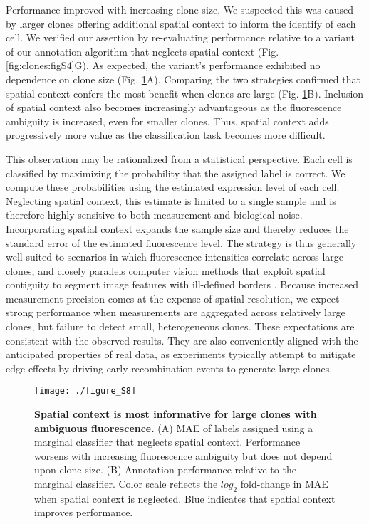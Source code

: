 Performance improved with increasing clone size. We suspected this was caused by larger clones offering additional spatial context to inform the identify of each cell. We verified our assertion by re-evaluating performance relative to a variant of our annotation algorithm that neglects spatial context (Fig. \ref{fig:clones:figS4}G). As expected, the variant's performance exhibited no dependence on clone size (Fig. \ref{fig:clones:figS8}A). Comparing the two strategies confirmed that spatial context confers the most benefit when clones are large (Fig. \ref{fig:clones:figS8}B). Inclusion of spatial context also becomes increasingly advantageous as the fluorescence ambiguity is increased, even for smaller clones. Thus, spatial context adds progressively more value as the classification task becomes more difficult.

This observation may be rationalized from a statistical perspective. Each cell is classified by maximizing the probability that the assigned label is correct. We compute these probabilities using the estimated expression level of each cell. Neglecting spatial context, this estimate is limited to a single sample and is therefore highly sensitive to both measurement and biological noise. Incorporating spatial context expands the sample size and thereby reduces the standard error of the estimated fluorescence level. The strategy is thus generally well suited to scenarios in which fluorescence intensities correlate across large clones, and closely parallels computer vision methods that exploit spatial contiguity to segment image features with ill-defined borders \cite{Nguyen2012}. Because increased measurement precision comes at the expense of spatial resolution, we expect strong performance when measurements are aggregated across relatively large clones, but failure to detect small, heterogeneous clones. These expectations are consistent with the observed results. They are also conveniently aligned with the anticipated properties of real data, as experiments typically attempt to mitigate edge effects by driving early recombination events to generate large clones.

\begin{figure}[h]
\texttt{[image: ./figure\_S8]}
\captionsetup{width=.65\linewidth}
\caption[Spatial context is most informative for large and ambiguous clones.]{\textbf{Spatial context is most informative for large clones with ambiguous fluorescence.}
(A) MAE of labels assigned using a marginal classifier that neglects spatial context. Performance worsens with increasing fluorescence ambiguity but does not depend upon clone size. (B) Annotation performance relative to the marginal classifier. Color scale reflects the $log_2$ fold-change in MAE when spatial context is neglected. Blue indicates that spatial context improves performance.}
\label{fig:clones:figS8}
\end{figure}

